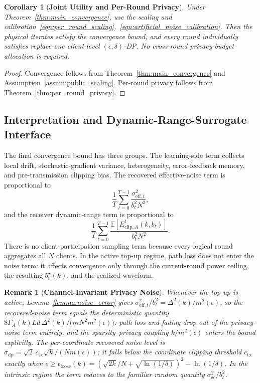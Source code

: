 \documentclass[journal]{IEEEtran}
\newtheorem{corollary}{Corollary}
\newtheorem{remark}{Remark}
\begin{document}
\begin{corollary}[\bf Joint Utility and Per-Round Privacy]
    \label{cor:joint_utility_privacy}
    Under Theorem~\ref{thm:main_convergence}, use the scaling and calibration~\eqref{eqn:per_round_scaling},~\eqref{eqn:artificial_noise_calibration}. Then the physical iterates satisfy the convergence bound, and every round individually satisfies replace-one client-level $(\epsilon,\delta)$-DP. No cross-round privacy-budget allocation is required.
\end{corollary}
\begin{proof}
    Convergence follows from Theorem~\ref{thm:main_convergence} and Assumption~\ref{assum:public_scaling}. Per-round privacy follows from Theorem~\ref{thm:per_round_privacy}.
\end{proof}

\subsection{Interpretation and Dynamic-Range-Surrogate Interface}

The final convergence bound has three groups. The learning-side term collects local drift, stochastic-gradient variance, heterogeneity, error-feedback memory, and pre-transmission clipping bias. The recovered effective-noise term is proportional to
\begin{equation}
    \frac1T\sum_{t=0}^{T-1}\frac{\sigma_{\mathrm{eff},t}^2}{b_t^2N^2},
\end{equation}
and the receiver dynamic-range term is proportional to
\begin{equation}
    \frac1T\sum_{t=0}^{T-1}
    \frac{\mathbb E[E_{\mathrm{clip},A}^t(k,b_t)]}{b_t^2N^2}.
\end{equation}
There is no client-participation sampling term because every logical round aggregates all $N$ clients. In the active top-up regime, path loss does not enter the noise term: it affects convergence only through the current-round power ceiling, the resulting $b_t^\star(k)$, and the realized waveform.

\begin{remark}[\bf Channel-Invariant Privacy Noise]
    \label{rem:channel_invariant}
    Whenever the top-up is active, Lemma~\ref{lemma:noise_error} gives $\sigma_{\mathrm{eff},t}^2/b_t^2=\Delta^2(k)/m^2(\epsilon)$, so the recovered-noise term equals the deterministic quantity $8\Gamma_A(k)Ld\,\Delta^2(k)/\big(\eta\tau N^2 m^2(\epsilon)\big)$: path loss and fading drop out of the privacy-noise term entirely, and the sparsity--privacy coupling $k/m^2(\epsilon)$ enters the bound explicitly. The per-coordinate recovered noise level is $\sigma_{\mathrm{dp}}=\sqrt2\,c_{\mathrm{tx}}\sqrt k/(N m(\epsilon))$; it falls below the coordinate clipping threshold $c_{\mathrm{tx}}$ exactly when $\epsilon\ge\epsilon_{\mathrm{loose}}(k)=(\sqrt{2k}/N+\sqrt{\ln(1/\delta)})^2-\ln(1/\delta)$. In the intrinsic regime the term reduces to the familiar random quantity $\sigma_{\mathrm{sc}}^2/b_t^2$.
\end{remark}
\end{document}
